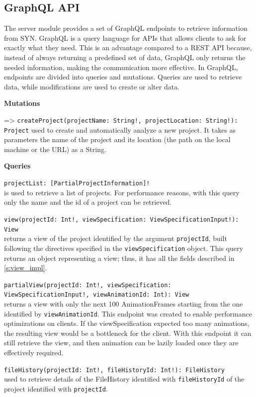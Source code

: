 \subsection*{GraphQL API} 
The server module provides a set of GraphQL endpoints to retrieve information from SYN. 
GraphQL is a query language for APIs that allows clients to ask for exactly what they need.
This is an advantage compared to a REST API because, instead of always returning a predefined set of data, GraphQL only returns the needed information, making the communication more effective. 
In GraphQL, endpoints are divided into queries and mutations. Queries are used to retrieve data, while modifications are used to create or alter data. 


\textbf{Mutations}

=> \texttt{createProject(projectName: String!, projectLocation: String!): Project} 
used to create and automatically analyze a new project.
It takes as parameters the name of the project and its location (the path on the local machine or the URL) as a String. 


\textbf{Queries}

\texttt{projectList:  [PartialProjectInformation]!} \\ 
is used to retrieve a list of projects. For performance reasons, with this query only the name and the id of a project can be retrieved. 

\texttt{view(projectId: Int!, viewSpecification: ViewSpecificationInput!): View} \\
returns a view of the project identified by the argument \texttt{projectId}, built following the directives specified in the \texttt{viewSpecification} object. 
This query returns an object representing a view; thus, it has all the fields described in \autoref{s:view_impl}. 

\texttt{partialView(projectId: Int!, viewSpecification: ViewSpecificationInput!, viewAnimationId: Int): View} \\
returns a view with only the next 100 AnimationFrames starting from the one identified by \texttt{viewAnimationId}. 
This endpoint was created to enable performance optimizations on clients. If the viewSpecification expected too many animations, the resulting view would be a bottleneck for the client.
With this endpoint it can still retrieve the view, and then animation can be lazily loaded once they are effectively required. 

\texttt{fileHistory(projectId: Int!, fileHistoryId: Int!): FileHistory} \\
used to retrieve details of the FileHistory identified with \texttt{fileHistoryId} of the project identified with \texttt{projectId}.

